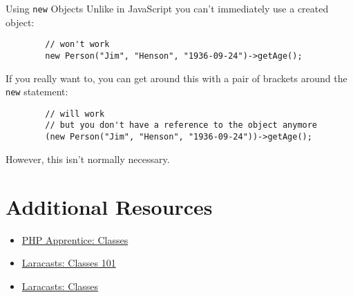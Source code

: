 \begin{infobox}{Using \texttt{new} Objects}
    Unlike in JavaScript you can't immediately use a created object:

    \begin{verbatim}
        // won't work
        new Person("Jim", "Henson", "1936-09-24")->getAge();
    \end{verbatim}

    If you really want to, you can get around this with a pair of brackets around the \texttt{new} statement:

    \begin{verbatim}
        // will work
        // but you don't have a reference to the object anymore
        (new Person("Jim", "Henson", "1936-09-24"))->getAge();
    \end{verbatim}

    However, this isn't normally necessary.
\end{infobox}


\section{Additional Resources}

\begin{itemize}[leftmargin=*]
    \item \href{https://phpapprentice.com/classes.html}{PHP Apprentice: Classes}
    \item \href{https://laracasts.com/series/php-for-beginners/episodes/12}{Laracasts: Classes 101}
    \item \href{https://laracasts.com/series/object-oriented-bootcamp-in-php/episodes/1}{Laracasts: Classes}
\end{itemize}
